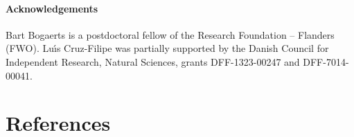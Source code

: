\documentclass[3p,number,authoryear]{elsarticle}
\begin{document}
\paragraph{Acknowledgements}
Bart Bogaerts is a postdoctoral fellow of the Research Foundation -- Flanders (FWO).
Lu\'\i s Cruz-Filipe was partially supported by the Danish Council for Independent Research, Natural Sciences, grants DFF-1323-00247 and DFF-7014-00041.

\section*{References}


\end{document}

